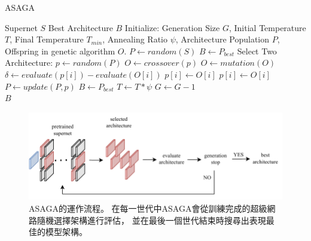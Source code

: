 \documentclass[a4paper,12pt]{extarticle}
\begin{document}
                \begin{algorithm}
                    \caption{
                        ASAGA
                        \label{alg:ASAGA}
                    }
                    \begin{algorithmic}[1]
                        \Require Supernet $S$
                        \Ensure Best Architecture $B$
                        \State Initialize: Generation Size $G$, Initial Temperature $T$,
                        Final Temperature $T_{min}$, Annealing Ratio $\psi$, Architecture Population $P$,
                        Offspring in genetic algorithm $O$.
                        \State $P \gets random(S)$
                        \State $B \gets P_{best}$
                                \State Select Two Architecture: $p \gets random(P)$
                                \State $O \gets crossover(p)$
                                \State $O \gets mutation(O)$
                                    \State $\delta \gets evaluate(p[i]) - evaluate(O[i])$
                                        \State $p[i] \gets O[i]$
                                        \State $p[i] \gets O[i]$
                                    \EndIf
                                \EndFor
                            \State $P \gets update(P, p)$
                            \EndFor
                            \State $B \gets P_{best}$
                        \EndIf
                        \State $T \gets T*\psi$
                        \State $G \gets G - 1$
                        \EndWhile \\
                        \Return $B$
                    \end{algorithmic}
                \end{algorithm}

            \begin{figure}[htb]
                \includegraphics[width=\textwidth]{flow.pdf}
                \caption{
                    ASAGA的運作流程。
                    在每一世代中ASAGA會從訓練完成的超級網路隨機選擇架構進行評估，
                    並在最後一個世代結束時搜尋出表現最佳的模型架構。
                }
                \label{fig:ASAGA}
            \end{figure}
\end{document}
